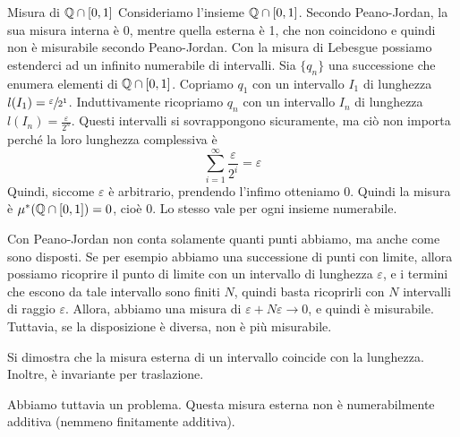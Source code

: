 \documentclass[a4paper]{article}
\begin{document}
\begin{radioactive}
\begin{snippetexample}{Misura di \(\mathbb{Q} \cap [0,1]\)}
    Consideriamo l'insieme \(\mathbb{Q} \cap [0,1]\).
    Secondo Peano-Jordan, la sua misura interna è 0, mentre quella esterna è 1,
    che non coincidono e quindi non è misurabile secondo Peano-Jordan.
    Con la misura di Lebesgue possiamo estenderci ad un infinito numerabile
    di intervalli. Sia
    \(\{q_n\}\) una successione che enumera elementi di \(\mathbb{Q} \cap [0,1]\).
    Copriamo \(q_1\) con un intervallo \(I_1\) di lunghezza
    \(l(I_1) = \sfrac{\varepsilon}{2^1}\).
    Induttivamente ricopriamo \(q_n\) con un intervallo \(I_n\)
    di lunghezza \(l(I_n) = \frac{\varepsilon}{2^n}\).
    Questi intervalli si sovrappongono sicuramente, ma ciò non importa
    perché la loro lunghezza complessiva è
    \[
        \sum_{i=1}^\infty\frac{\varepsilon}{2^i}=\varepsilon
    \]
    Quindi, siccome \(\varepsilon\) è arbitrario, prendendo l'infimo otteniamo \(0\).
    Quindi la misura è \(\mu^*(\mathbb{Q}\cap[0,1])=0\),
    cioè \(0\).
    Lo stesso vale per ogni insieme numerabile.
\end{snippetexample}
\end{radioactive}

\begin{radioactive}
Con Peano-Jordan non conta solamente quanti punti abbiamo, ma anche come sono disposti.
Se per esempio abbiamo una successione di punti con limite, allora possiamo ricoprire il punto di limite
con un intervallo di lunghezza \(\varepsilon\), e i termini che escono da tale intervallo
sono finiti \(N\), quindi basta ricoprirli con \(N\) intervalli di raggio \(\varepsilon\).
Allora, abbiamo una misura di \(\varepsilon + N\varepsilon \to 0\), e quindi è misurabile.
Tuttavia, se la disposizione è diversa, non è più misurabile.
\end{radioactive}

\begin{radioactive}
\begin{snippetproposition}{}
    Si dimostra che la misura esterna di un intervallo coincide con la lunghezza.
    Inoltre, è invariante per traslazione.
\end{snippetproposition}
\end{radioactive}

\begin{radioactive}
Abbiamo tuttavia un problema. Questa misura esterna non è numerabilmente additiva
(nemmeno finitamente additiva).
\end{radioactive}
\end{document}
